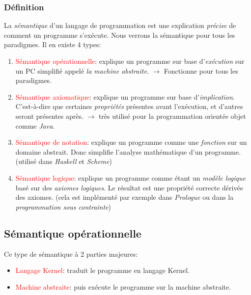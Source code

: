 \documentclass{report}
\begin{document}
\subsubsection{Définition}
La \textit{sémantique} d'un langage de programmation est une explication \textit{précise} de comment un programme s'exécute. Nous verrons la sémantique pour tous les paradigmes. Il en existe 4 types:
\begin{enumerate}
\item \textcolor{red}{Sémantique opérationnelle}: explique un programme sur base d'\textit{exécution} sur un PC simplifié appelé \textit{la machine abstraite}. $\rightarrow$ Fonctionne pour tous les paradigmes.
\item \textcolor{red}{Sémantique axiomatique}: explique un programme sur base d'\textit{implication}. C'est-à-dire que certaines \textit{propriétés} présentes avant l'exécution, et d'autres seront présentes après. $\rightarrow$ très utilisé pour la programmation orientée objet comme \textit{Java}.
\item \textcolor{red}{Sémantique de notation}: explique un programme comme une \textit{fonction} sur un domaine abstrait. Donc simplifie l'analyse mathématique d'un programme. (utilisé dans \textit{Haskell} et \textit{Scheme})
\item \textcolor{red}{Sémantique logique}: explique un programme comme étant un \textit{modèle logique} basé sur des \textit{axiomes logiques}. Le résultat est une propriété correcte dérivée des axiomes. (cela est implémenté par exemple dans \textit{Prologue} ou dans la \textit{programmation sous contrainte})
\end{enumerate}

\subsection{Sémantique opérationnelle}
Ce type de sémantique à 2 parties majeures:
\begin{itemize}
\item \textcolor{red}{Langage Kernel}: traduit le programme en langage Kernel.
\item \textcolor{red}{Machine abstraite}: puis exécute le programme sur la machine abstraite.
\end{itemize}
\end{document}
